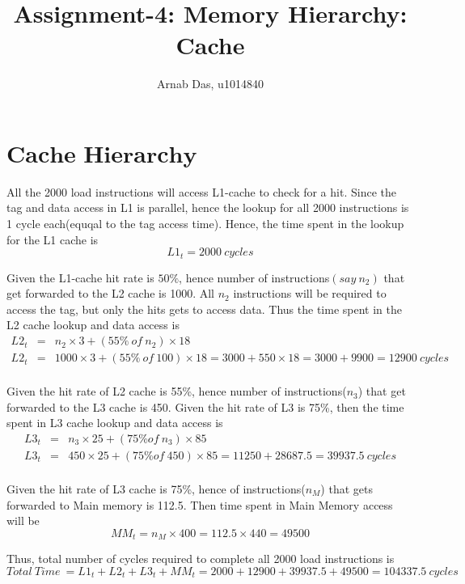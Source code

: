 \documentclass{tufte-handout}
\title{Assignment-4: Memory Hierarchy: Cache}
\author[]{Arnab Das, u1014840}
\begin{document}
  
  \maketitle%
  

 \setcounter{secnumdepth}{1}

\newpage

\section{$\textbf{Cache Hierarchy}$}
	All the 2000 load instructions will access L1-cache to check for a hit. Since the tag and data access in L1 is parallel, hence the lookup for all 2000 instructions is 1 cycle each(equqal to the tag access time). Hence, the time spent in the lookup for the L1 cache is
	\[
		L1_t = 2000\ cycles
	\]

	Given the L1-cache hit rate is $50\%$,  hence number of instructions$( say\ n_2)$ that get forwarded to the L2 cache is 1000. All $n_2$ instructions will be required to access the tag, but only the hits gets to access data. Thus the time spent in the L2 cache lookup and data access is
	\begin{eqnarray*}
		L2_t &=& n_2\times 3 + (55\%\ of\ n_2)\times 18 \\
		L2_t &=& 1000\times 3 + (55\%\ of\ 100)\times 18 = 3000 + 550\times 18 = 3000 + 9900 = 12900\ cycles \\
	\end{eqnarray*}

	Given the hit rate of L2 cache is 55\%, hence number of instructions($n_3$) that get forwarded to the L3 cache is 450. Given the hit rate of L3 is 75\%, then the time spent in L3 cache lookup and data access is
	\begin{eqnarray*}
		L3_t &=& n_3\times 25 + (75\% of\ n_3)\times 85 \\ 
		L3_t &=& 450\times 25 + (75\% of\ 450)\times 85 = 11250 + 28687.5 = 39937.5\ cycles \\ 
	\end{eqnarray*}

	Given the hit rate of L3 cache is 75\%, hence of instructions($n_M$) that gets forwarded to Main memory is 112.5. Then time spent in Main Memory access will be
	\[
		MM_t = n_M\times 400 = 112.5 \times 440 = 49500	
	\]

	Thus, total number of cycles required to complete all 2000 load instructions is
	\[
		Total\ Time\ = L1_t + L2_t + L3_t + MM_t = 2000 + 12900 + 39937.5 + 49500 = 104337.5\ cycles
	\]
\end{document}
